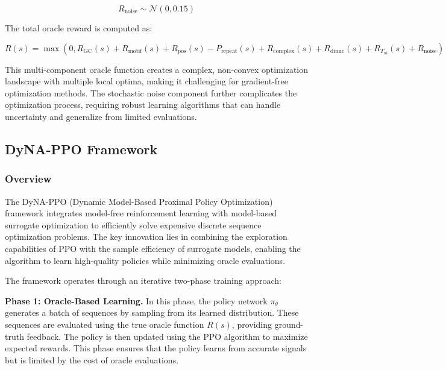 \documentclass[conference]{IEEEtran}
\begin{document}
\begin{equation}
R_{\text{noise}} \sim \mathcal{N}(0, 0.15)
\end{equation}

The total oracle reward is computed as:

\begin{equation}
R(s) = \max\left(0, R_{\text{GC}}(s) + R_{\text{motif}}(s) + R_{\text{pos}}(s) - P_{\text{repeat}}(s) + R_{\text{complex}}(s) + R_{\text{dinuc}}(s) + R_{T_m}(s) + R_{\text{noise}}\right)
\end{equation}

This multi-component oracle function creates a complex, non-convex optimization landscape with multiple local optima, making it challenging for gradient-free optimization methods. The stochastic noise component further complicates the optimization process, requiring robust learning algorithms that can handle uncertainty and generalize from limited evaluations.







\subsection{DyNA-PPO Framework}
\subsubsection{Overview}

The DyNA-PPO (Dynamic Model-Based Proximal Policy Optimization) framework integrates model-free reinforcement learning with model-based surrogate optimization to efficiently solve expensive discrete sequence optimization problems. The key innovation lies in combining the exploration capabilities of PPO with the sample efficiency of surrogate models, enabling the algorithm to learn high-quality policies while minimizing oracle evaluations.

The framework operates through an iterative two-phase training approach:

\textbf{Phase 1: Oracle-Based Learning.} In this phase, the policy network $\pi_\theta$ generates a batch of sequences by sampling from its learned distribution. These sequences are evaluated using the true oracle function $R(s)$, providing ground-truth feedback. The policy is then updated using the PPO algorithm to maximize expected rewards. This phase ensures that the policy learns from accurate signals but is limited by the cost of oracle evaluations.
\end{document}
